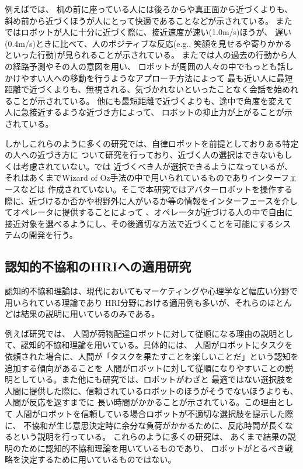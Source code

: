 \documentclass{kuisthesis}
\begin{document}
例えば\cite{woods2006methodological}では、
机の前に座っている人には後ろからや真正面から近づくよりも、斜め前から近づくほうが人にとって快適であることなどが示されている。
また\cite{joosse2021making}ではロボットが人に十分に近づく際に、接近速度が速い(1.0m/s)ほうが、
遅い(0.4m/s)ときに比べて、人のポジティブな反応(e.g., 笑顔を見せるや寄りかかるといった行動)が見られることが示されている。
また\cite{satake2009approach}では人の過去の行動から人の経路予測やその人の意図を用い、
ロボットが周囲の人々の中でもっとも話しかけやすい人への移動を行うようなアプローチ方法によって
最も近い人に最短距離で近づくよりも、無視される、気づかれないといったことなく会話を始めれることが示されている。
他にも最短距離で近づくよりも、途中で角度を変えて人に急接近するような近づき方によって、
ロボットの抑止力が上がることが示されている\cite{Mizumaru2019}。


しかしこれらのように多くの研究では、自律ロボットを前提としておりある特定の人への近づき方に
ついて研究を行っており、近づく人の選択はできないもしくは考慮されていない。\cite{Mizumaru2019}では
近づくべき人が選択できるようになっているが、それはあくまでWizard of Oz手法の中で用いられているものでありインターフェースなどは
作成されていない。そこで本研究ではアバターロボットを操作する際に、近づけるか否かや視野外に人がいるか等の情報をインターフェースを介してオペレータに提供することによって
、オペレータが近づける人の中で自由に接近対象を選べるようにし、その後適切な方法で近づくことを可能にするシステムの開発を行う。

\subsection{認知的不協和のHRIへの適用研究}
認知的不協和理論\cite{Festinger1957}は、現代においてもマーケティングや心理学など幅広い分野で用いられている理論であり
HRI分野における適用例も多いが、それらのほとんどは結果の説明に用いているのみである。

例えば研究\cite{washburn2022exploring}では、
人間が荷物配達ロボットに対して従順になる理由の説明として、認知的不協和理論を用いている。具体的には、
人間がロボットにタスクを依頼された場合に、人間が「タスクを果たすことを楽しいことだ」という認知を追加する傾向があることを
人間がロボットに対して従順になりやすいことの説明としている。また他にも研究\cite{herse2018you}では、ロボットがわざと
最適ではない選択肢を人間に提供した際に、信頼されているロボットのほうがそうでないほうよりも、人間が反応を返すまでに
長い時間がかかることが示されている。この理由として
人間がロボットを信頼している場合ロボットが不適切な選択肢を提示した際に、
不協和が生じ意思決定時に余分な負荷がかかるために、反応時間が長くなるという説明を行っている。
これらのように多くの研究は、
あくまで結果の説明のために認知的不協和理論を用いているものであり、
ロボットがとるべき戦略を決定するために用いているものではない。
\end{document}
